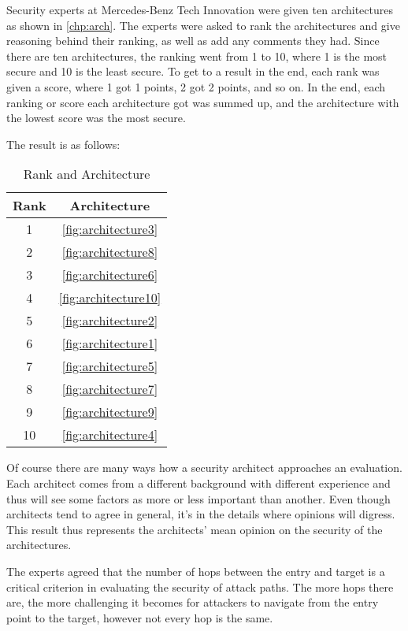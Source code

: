 Security experts at Mercedes-Benz Tech Innovation were given ten architectures as shown in \ref{chp:arch}.
The experts were asked to rank the architectures and give reasoning behind their ranking, as well as add any comments they had.
Since there are ten architectures, the ranking went from 1 to 10, where 1 is the most secure and 10 is the least secure.
To get to a result in the end, each rank was given a score, where 1 got 1 points, 2 got 2 points, and so on.
In the end, each ranking or score each architecture got was summed up, and the architecture with the lowest score was the most secure.

The result is as follows:

\begin{table}[h]
    \label{table:survey}
    \centering
    \caption{Rank and Architecture}
    \begin{tabular}{ |c|c| } 
    \hline
    Rank & Architecture \\
    \hline
    1 & \ref{fig:architecture3}\\
    2 & \ref{fig:architecture8}\\
    3 & \ref{fig:architecture6}\\
    4 & \ref{fig:architecture10}\\
    5 & \ref{fig:architecture2}\\
    6 & \ref{fig:architecture1}\\
    7 & \ref{fig:architecture5}\\
    8 & \ref{fig:architecture7}\\
    9 & \ref{fig:architecture9}\\
    10 & \ref{fig:architecture4}\\
    \hline
    \end{tabular}
\end{table}

Of course there are many ways how a security architect approaches an evaluation.
Each architect comes from a different background with different experience and thus will see some factors as more or less important than another.
Even though architects tend to agree in general, it's in the details where opinions will digress.
This result thus represents the architects' mean opinion on the security of the architectures. 

The experts agreed that the number of hops between the entry and target is a critical criterion in evaluating the security of attack paths. 
The more hops there are, the more challenging it becomes for attackers to navigate from the entry point to the target, however not every hop is the same.\\

